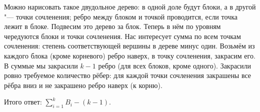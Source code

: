 	Можно нарисовать такое двудольное дерево: в одной доле будут блоки,
	а в другой "--- точки сочленения; ребро между блоком и точкой проводится,
	если точка лежит в блоке.
	Подвесим это дерево за блок.
	Теперь в нём по уровням чередуются блоки и точки сочленения.
	Нас интересует сумма по всем точкам сочленения: степень соответствующей вершины в дереве минус один.
	Возьмём из каждого блока (кроме корневого) ребро наверх, в точку сочленения, закрасим его.
	В суммые мы закрасили $k-1$ ребро (для всех блоков, кроме одного).
	Закрасили ровно требуемое количество рёбер: для каждой точки сочленения закрашены все рёбра
	вниз и не закрашено ребро наверх (к корню).

	Итого ответ: $\sum_{i=1}^k B_i - (k - 1)$.
